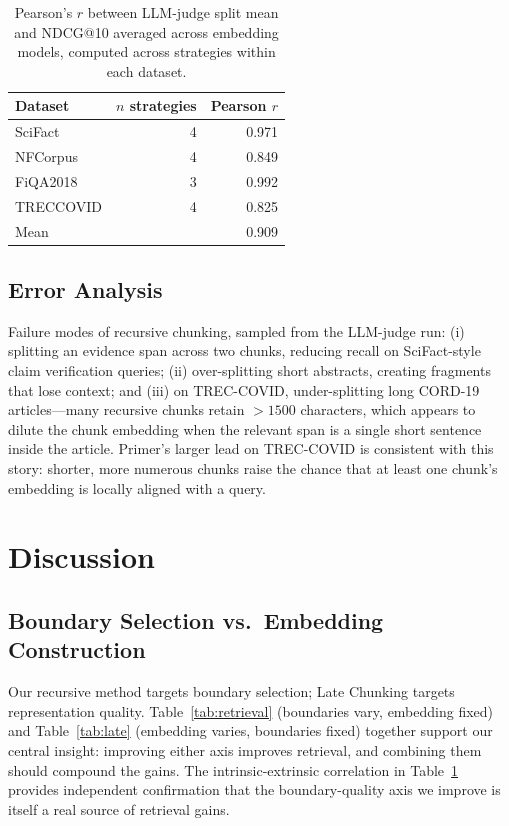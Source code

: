 \documentclass[conference]{IEEEtran}
\begin{document}
\begin{table}[!t]
\caption{Pearson's $r$ between LLM-judge split mean and NDCG@10 averaged across embedding models, computed across strategies within each dataset.}
\label{tab:corr}
\centering
\setlength{\tabcolsep}{4pt}
\begin{tabular}{lrr}
\toprule
Dataset & $n$ strategies & Pearson $r$ \\
\midrule
SciFact   & 4 & 0.971 \\
NFCorpus  & 4 & 0.849 \\
FiQA2018  & 3 & 0.992 \\
TRECCOVID & 4 & 0.825 \\
\midrule
Mean      &   & 0.909 \\
\bottomrule
\end{tabular}
\end{table}

\subsection{Error Analysis}

Failure modes of recursive chunking, sampled from the LLM-judge run:
(i) splitting an evidence span across two chunks, reducing recall on
SciFact-style claim verification queries; (ii) over-splitting short
abstracts, creating fragments that lose context; and (iii) on TREC-COVID,
under-splitting long CORD-19 articles---many recursive chunks retain
$> 1500$ characters, which appears to dilute the chunk embedding when the
relevant span is a single short sentence inside the article. Primer's
larger lead on TREC-COVID is consistent with this story: shorter, more
numerous chunks raise the chance that at least one chunk's embedding is
locally aligned with a query.

\section{Discussion}

\subsection{Boundary Selection vs.\ Embedding Construction}

Our recursive method targets boundary selection; Late Chunking targets
representation quality. Table~\ref{tab:retrieval} (boundaries vary,
embedding fixed) and Table~\ref{tab:late} (embedding varies, boundaries
fixed) together support our central insight: improving either axis
improves retrieval, and combining them should compound the gains. The
intrinsic-extrinsic correlation in Table~\ref{tab:corr} provides
independent confirmation that the boundary-quality axis we improve is
itself a real source of retrieval gains.
\end{document}
